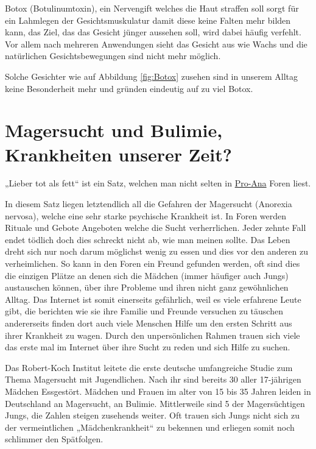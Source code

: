 Botox (Botulinumtoxin), ein Nervengift welches die Haut straffen soll sorgt für ein Lahmlegen der
Gesichtsmuskulatur damit diese keine Falten mehr bilden kann, das Ziel, das das Gesicht jünger
aussehen soll, wird dabei häufig verfehlt. Vor allem nach mehreren Anwendungen sieht das Gesicht aus
wie Wachs und die natürlichen Gesichtsbewegungen sind nicht mehr möglich.

Solche Gesichter wie auf Abbildung \vref{fig:Botox} zusehen sind in unserem Alltag
keine Besonderheit mehr und gründen eindeutig auf zu viel Botox.

\section{Magersucht und Bulimie, Krankheiten unserer Zeit?}
„Lieber tot als fett“ ist ein Satz, welchen man nicht selten in
\href{http://de.wikipedia.org/wiki/Pro-Ana}{Pro-Ana} Foren liest.

In diesem Satz liegen letztendlich all die Gefahren der Magersucht (Anorexia nervosa), welche eine
sehr starke psychische Krankheit ist. In Foren werden Rituale und Gebote Angeboten welche die Sucht
verherrlichen. Jeder zehnte Fall endet tödlich doch dies schreckt nicht ab, wie man meinen sollte.
Das Leben dreht sich nur noch darum möglichst wenig zu essen und dies vor den anderen zu
verheimlichen. So kann in den Foren ein Freund gefunden werden, oft sind dies die einzigen Plätze an
denen sich die Mädchen (immer häufiger auch Jungs) austauschen können, über ihre Probleme und ihren
nicht ganz gewöhnlichen Alltag. Das Internet ist somit einerseits gefährlich, weil es viele erfahrene
Leute gibt, die berichten wie sie ihre Familie und Freunde versuchen zu täuschen andererseits finden
dort auch viele Menschen Hilfe um den ersten Schritt aus ihrer Krankheit zu wagen. Durch den
unpersönlichen Rahmen trauen sich viele das erste mal im Internet über ihre Sucht zu reden und sich
Hilfe zu suchen.

Das Robert-Koch Institut leitete die erste deutsche umfangreiche Studie zum Thema Magersucht mit
 Jugendlichen. Nach ihr sind bereits 30\Prozent{} aller 17-jährigen Mädchen
Essgestört.  Mädchen und Frauen im alter von 15 bis 35 Jahren leiden in Deutschland
an Magersucht,  an Bulimie. Mittlerweile sind 5\Prozent{} der Magersüchtigen Jungs,
die Zahlen steigen zusehends weiter. Oft trauen sich Jungs nicht sich zu der vermeintlichen
„Mädchenkrankheit“ zu bekennen und erliegen somit noch schlimmer den Spätfolgen.


